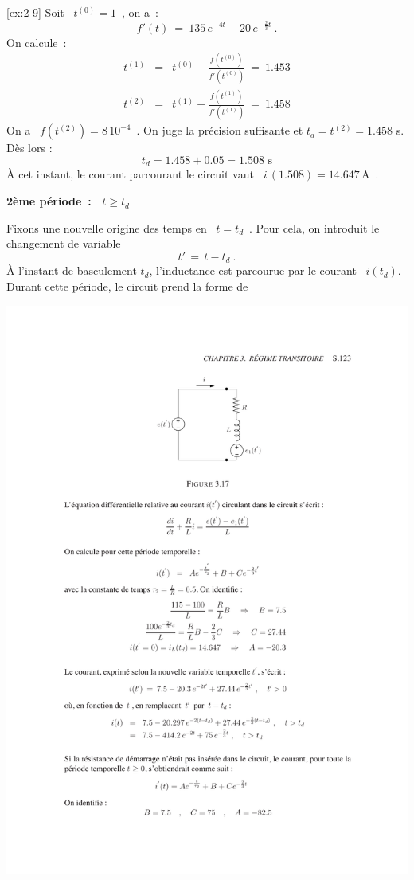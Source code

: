 \begin{solexercise}{\ref{ex:2-9}}
Soit \ $t^{(0)} = 1$~, on a~:
\[ f'(t) \: = \: 135\, e^{-4t} - 20 \, e^{-\frac{2}{3}t}~.\]
On calcule~:
\begin{eqnarray*}
	t^{(1)} &=& t^{(0)} - \frac{f(t^{(0)})}{f'(t^{(0)})} \: = \: 1.453\\
	t^{(2)} &=& t^{(1)} - \frac{f(t^{(1)})}{f'(t^{(1)})} \: = \: 1.458
\end{eqnarray*}
On a \ $f(t^{(2)}) = 8\, 10^{-4}$~. On juge la pr\'ecision suffisante et
$t_a = t^{(2)} = 1.458$ s. D\`es lors :
\[t_d=1.458+0.05=1.508\,\, \mbox{s}\]
\`A cet instant, le courant parcourant le circuit vaut \ $i\, (1.508) =
14.647\,$A~.

\vspace{\baselineskip}
{\bf 2\`eme p\'eriode~: \ $ t \geq  t_d$}

Fixons une nouvelle origine des temps en \ $t=t_d$~. Pour cela, on introduit le changement de variable
\[ t' \, = \, t - t_d~. \]
\`A l'instant de basculement $t_d$, l'inductance est parcourue par le courant \ $i(t_d)$.
Durant cette p\'eriode, le circuit prend la forme de 
\begin{center}
	\includegraphics[width=\linewidth]{sol_exercices/ex3-9-3}
\end{center}



\end{solexercise}
